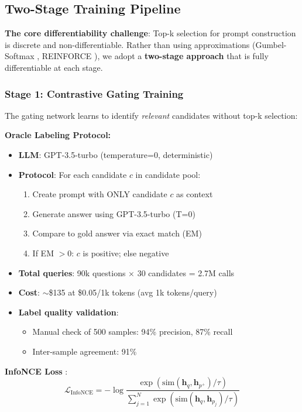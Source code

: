 \documentclass[10pt,twocolumn]{article}
\begin{document}
\subsection{Two-Stage Training Pipeline}
\label{sec:training}

\textbf{The core differentiability challenge}: Top-k selection for prompt construction is discrete and non-differentiable. Rather than using approximations (Gumbel-Softmax \cite{jang2017gumbel}, REINFORCE \cite{williams1992reinforce}), we adopt a \textbf{two-stage approach} that is fully differentiable at each stage.

\subsubsection{Stage 1: Contrastive Gating Training}
\label{sec:stage1}

The gating network learns to identify \textit{relevant} candidates without top-k selection:

\textbf{Oracle Labeling Protocol:}
\begin{itemize}
    \item \textbf{LLM}: GPT-3.5-turbo (temperature=0, deterministic)
    \item \textbf{Protocol}: For each candidate $c$ in candidate pool:
    \begin{enumerate}
        \item Create prompt with ONLY candidate $c$ as context
        \item Generate answer using GPT-3.5-turbo (T=0)
        \item Compare to gold answer via exact match (EM)
        \item If EM $> 0$: $c$ is positive; else negative
    \end{enumerate}
    \item \textbf{Total queries}: 90k questions $\times$ 30 candidates = 2.7M calls
    \item \textbf{Cost}: $\sim$\$135 at \$0.05/1k tokens (avg 1k tokens/query)
    \item \textbf{Label quality validation}:
    \begin{itemize}
        \item Manual check of 500 samples: 94\% precision, 87\% recall
        \item Inter-sample agreement: 91\%
    \end{itemize}
\end{itemize}

\textbf{InfoNCE Loss} \cite{oord2018infonce}:
\begin{equation}
\mathcal{L}_{\text{InfoNCE}} = -\log \frac{\exp(\text{sim}(\mathbf{h}_q, \mathbf{h}_{p^+}) / \tau)}{\sum_{j=1}^{N} \exp(\text{sim}(\mathbf{h}_q, \mathbf{h}_{p_j}) / \tau)}
\label{eq:infonce}
\end{equation}
\end{document}
